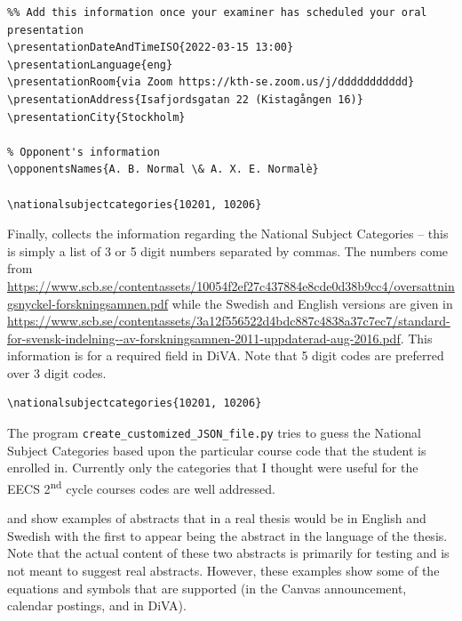 \else
\begin{lstlisting}[language={[LaTeX]TeX}, extendedchars=false, caption={Information relevant to the oral presentation (both the location and the opponent or opponents)}, label=lst:oralpresentatioOpponents] 
%%%%% For the oral presentation
%% Add this information once your examiner has scheduled your oral presentation
\presentationDateAndTimeISO{2022-03-15 13:00}
\presentationLanguage{eng}
\presentationRoom{via Zoom https://kth-se.zoom.us/j/ddddddddddd}
\presentationAddress{Isafjordsgatan 22 (Kistagången 16)}
\presentationCity{Stockholm}

% Opponent's information
\opponentsNames{A. B. Normal \& A. X. E. Normalè}

\nationalsubjectcategories{10201, 10206}
\end{lstlisting}
\fi
{}
Finally,  collects the information regarding the National Subject Categories – this is simply a list of 3 or 5 digit numbers separated by commas. The numbers come from \url{https://www.scb.se/contentassets/10054f2ef27c437884e8cde0d38b9cc4/oversattningsnyckel-forskningsamnen.pdf} while the Swedish and English versions are given in \url{https://www.scb.se/contentassets/3a12f556522d4bdc887c4838a37c7ec7/standard-for-svensk-indelning--av-forskningsamnen-2011-uppdaterad-aug-2016.pdf}. This information is for a required field in DiVA. Note that 5 digit codes are preferred over 3 digit codes.
\begin{lstlisting}[language={[LaTeX]TeX}, caption={Information relevant to the oral presentation (both the location and the opponent or opponents}, label=lst:nationalSubjects] 
\nationalsubjectcategories{10201, 10206}
\end{lstlisting}

The program \texttt{create\_customized\_JSON\_file.py} tries to guess the National Subject Categories based upon the particular course code that the student is enrolled in. Currently only the categories that I thought were useful for the EECS 2\textsuperscript{nd} cycle courses codes are well addressed.

 and  show examples of abstracts that in a real thesis would be in English and Swedish with the first to appear being the abstract in the language of the thesis. Note that the actual content of these two abstracts is primarily for testing and is not meant to suggest real abstracts. However, these examples show some of the equations and symbols that are supported (\ie in the Canvas announcement, calendar postings, and in DiVA).

